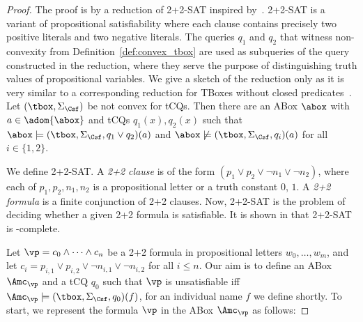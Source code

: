 \documentclass{lmcs}
\theoremstyle{definition}
\begin{document}
\begin{proof}
The proof is by a reduction of 2+2-SAT inspired by~\cite{Schaerf-93}. 2+2-SAT is a variant of 
propositional satisfiability where each clause contains precisely two 
positive literals and two negative literals. The 
queries $q_1$ and $q_2$ that witness non-convexity from 
Definition~\ref{def:convex_tbox} are used as subqueries of the query 
constructed in the reduction, where they serve the purpose of 
distinguishing truth values of propositional variables. We give a sketch of the reduction only 
as it is very similar to a corresponding reduction for TBoxes without closed predicates~\cite{DBLP:journals/lmcs/LutzW17}. 
Let $(\tbox,\Sigma_\Csf)$ be not convex for tCQs. Then there are an ABox 
$\abox$ with $a\in\adom{\abox}$ and tCQs $q_1(x), q_2(x)$ such that 
$\abox\models(\tbox,\Sigma_\Csf,q_1\vee q_2)(a)$ and 
$\abox\not\models(\tbox,\Sigma_\Csf,q_i)(a)$ for all $i\in\{1,2\}$.
  
We define 2+2-SAT. A \emph{2+2 clause} is of the form $(p_1
\vee p_2 \vee \neg n_1 \vee \neg n_2)$, where each of
$p_1,p_2,n_1,n_2$ is a propositional letter or a truth constant $0$, $1$. 
A \emph{2+2 formula} is a finite conjunction of 2+2 clauses. Now,
2+2-SAT is the problem of deciding whether a given 2+2 formula is
satisfiable. It is shown in \cite{Schaerf-93} that 2+2-SAT is
\NP-complete.

Let $\vp=c_0 \wedge \cdots \wedge c_{n}$ be a 2+2 formula in 
propositional letters $w_0,\dots,w_{m}$, and let $c_i=p_{i,1} \vee 
p_{i,2} \vee \neg n_{i,1} \vee \neg n_{i,2}$ for all $i \leq n$. Our 
aim is to define an ABox $\Amc_\vp$ and a tCQ $q_0$ such that $\vp$ 
is unsatisfiable iff $\Amc_\vp \models 
(\tbox,\Sigma_\Csf, q_0)(f)$, for an individual name $f$ we define shortly.
To start, we represent the formula $\vp$ in the ABox $\Amc_\vp$ as follows:
    

\end{proof}
\end{document}
